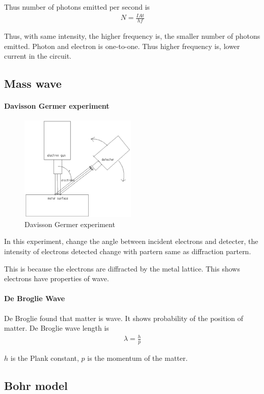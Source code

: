             Thus number of photons emitted per second is
            \begin{align}
                N = \frac{I A t}{h f}
            \end{align}

            Thus, with same intensity, the higher frequency is, the smaller number of photons emitted. Photon and electron is one-to-one. Thus higher frequency is, lower current in the circuit.

    \subsection{Mass wave}
        \paragraph{Davisson Germer experiment}
            \begin{figure}[H]
                \begin{center}
                    \includegraphics[height=5cm]{quantum_charts/dav_germ_exp.eps}
                \end{center}
                \caption{Davisson Germer experiment}
                \label{dav_germ_exp}
            \end{figure}

            In this experiment, change the angle between incident electrons and detecter, the intensity of electrons detected change with partern same as diffraction partern.

            This is because the electrons are diffracted by the metal lattice. This shows electrons have properties of wave.

        \paragraph{De Broglie Wave}
            De Broglie found that matter is wave. It shows probability of the position of matter. De Broglie wave length is
            \begin{align}
                \lambda = \frac{h}{p}
            \end{align}

            $h$ is the Plank constant, $p$ is the momentum of the matter.

    \subsection{Bohr model}
        


            

            